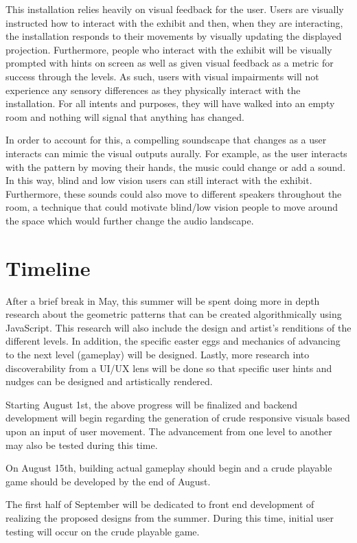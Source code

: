 \documentclass[10pt,twocolumn]{article}
\begin{document}
This installation relies heavily on visual feedback for the user.  Users are visually instructed how to interact with the exhibit and then, when they are interacting, the installation responds to their movements by visually updating the displayed projection.  Furthermore, people who interact with the exhibit will be visually prompted with hints on screen as well as given visual feedback as a metric for success through the levels. As such, users with visual impairments will not experience any sensory differences as they physically interact with the installation.  For all intents and purposes, they will have walked into an empty room and nothing will signal that anything has changed. 

In order to account for this, a compelling soundscape that changes as a user interacts can mimic the visual outputs aurally. For example, as the user interacts with the pattern by moving their hands, the music could change or add a sound.  In this way, blind and low vision users can still interact with the exhibit. Furthermore, these sounds could also move to different speakers throughout the room, a technique that could motivate blind/low vision people to move around the space which would further change the audio landscape. 

\section{Timeline}
After a brief break in May, this summer will be spent doing more in depth research about the geometric patterns that can be created algorithmically using JavaScript.  This research will also include the design and artist's renditions of the different levels.  In addition, the specific easter eggs and mechanics of advancing to the next level (gameplay) will be designed. Lastly, more research into discoverability from a UI/UX lens will be done so that specific user hints and nudges can be designed and artistically rendered.  

Starting August 1st, the above progress will be finalized and backend development will begin regarding the generation of crude responsive visuals based upon an input of user movement.  The advancement from one level to another may also be tested during this time. 

On August 15th, building actual gameplay should begin and a crude playable game should be developed by the end of August. 

The first half of September will be dedicated to front end development of realizing the proposed designs from the summer. During this time, initial user testing will occur on the crude playable game. 
\end{document}
